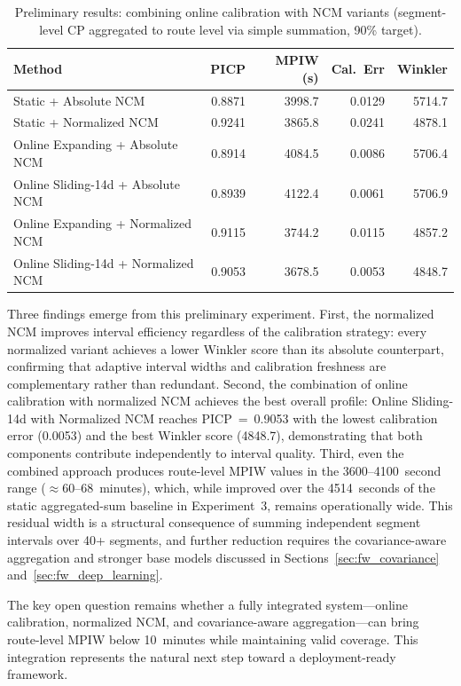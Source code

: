 \begin{table}[htbp]
\centering
\caption{Preliminary results: combining online calibration with NCM variants (segment-level CP aggregated to route level via simple summation, 90\% target).}
\label{tab:fw_combined_results}
\begin{tabular}{lrrrr}
\toprule
\textbf{Method} & \textbf{PICP} & \textbf{MPIW (s)} & \textbf{Cal.\ Err} & \textbf{Winkler} \\
\midrule
Static + Absolute NCM              & 0.8871 & 3998.7 & 0.0129 & 5714.7 \\
Static + Normalized NCM            & 0.9241 & 3865.8 & 0.0241 & 4878.1 \\
Online Expanding + Absolute NCM    & 0.8914 & 4084.5 & 0.0086 & 5706.4 \\
Online Sliding-14d + Absolute NCM  & 0.8939 & 4122.4 & 0.0061 & 5706.9 \\
Online Expanding + Normalized NCM  & 0.9115 & 3744.2 & 0.0115 & 4857.2 \\
Online Sliding-14d + Normalized NCM & 0.9053 & 3678.5 & 0.0053 & 4848.7 \\
\bottomrule
\end{tabular}
\end{table}

Three findings emerge from this preliminary experiment. First, the normalized NCM improves interval efficiency regardless of the calibration strategy: every normalized variant achieves a lower Winkler score than its absolute counterpart, confirming that adaptive interval widths and calibration freshness are complementary rather than redundant. Second, the combination of online calibration with normalized NCM achieves the best overall profile: Online Sliding-14d with Normalized NCM reaches PICP~=~0.9053 with the lowest calibration error (0.0053) and the best Winkler score (4848.7), demonstrating that both components contribute independently to interval quality. Third, even the combined approach produces route-level MPIW values in the 3600--4100~second range ($\approx$60--68~minutes), which, while improved over the 4514~seconds of the static aggregated-sum baseline in Experiment~3, remains operationally wide. This residual width is a structural consequence of summing independent segment intervals over 40+ segments, and further reduction requires the covariance-aware aggregation and stronger base models discussed in Sections~\ref{sec:fw_covariance} and~\ref{sec:fw_deep_learning}.

The key open question remains whether a fully integrated system---online calibration, normalized NCM, and covariance-aware aggregation---can bring route-level MPIW below 10~minutes while maintaining valid coverage. This integration represents the natural next step toward a deployment-ready framework.


